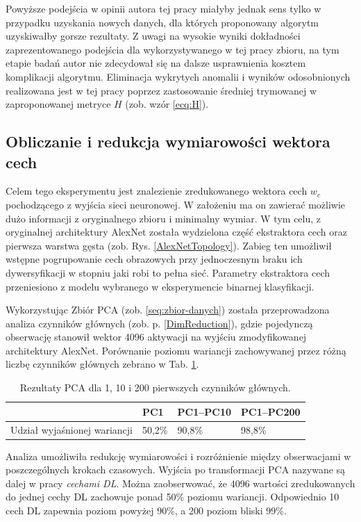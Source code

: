 Powyższe podejścia w opinii autora tej pracy miałyby jednak sens tylko w przypadku uzyskania nowych danych, dla których proponowany algorytm uzyskiwałby gorsze rezultaty. Z uwagi na wysokie wyniki dokładności zaprezentowanego podejścia dla wykorzystywanego w tej pracy zbioru, na tym etapie badań autor nie zdecydował się na dalsze usprawnienia kosztem komplikacji algorytmu. Eliminacja wykrytych anomalii i wyników odosobnionych realizowana jest w tej pracy poprzez zastosowanie średniej trymowanej w zaproponowanej metryce $H$ (zob. wzór \ref{ecq:H}).

\subsection{Obliczanie i redukcja wymiarowości wektora cech}

Celem tego eksperymentu jest znalezienie zredukowanego wektora cech $w_c$ pochodzącego z wyjścia sieci neuronowej. W założeniu ma on zawierać możliwie dużo informacji z oryginalnego zbioru i minimalny wymiar. W tym celu, z oryginalnej architektury AlexNet została wydzielona część ekstraktora cech oraz pierwsza warstwa gęsta (zob. Rys. \ref{AlexNetTopology}). Zabieg ten umożliwił wstępne pogrupowanie cech obrazowych przy jednoczesnym braku ich dywersyfikacji w stopniu jaki robi to pełna sieć. Parametry ekstraktora cech przeniesiono z modelu wybranego w eksperymencie binarnej klasyfikacji. 

Wykorzystując Zbiór PCA (zob. \ref{seq:zbior-danych}) została przeprowadzona analiza czynników głównych (zob. p. \ref{DimReduction}), gdzie pojedynczą obserwację stanowił wektor 4096 aktywacji na wyjściu zmodyfikowanej architektury AlexNet. Porównanie poziomu wariancji zachowywanej przez różną liczbę czynników głównych zebrano w Tab. \ref{PCA-results}.
\renewcommand{\arraystretch}{1.2}
\begin{table}[h!]
 \setlength{\tabcolsep}{12pt}
 \centering
 \caption{Rezultaty PCA dla 1, 10 i 200 pierwszych czynników głównych.}
 \label{PCA-results}
 \begin{tabular}{l|l|l|l}
 
 & PC1 & PC1--PC10 & PC1--PC200 \\ \hline \hline
 Udział wyjaśnionej wariancji & 50,2\% & 90,8\%   & 98,8\% \\ \hline 
 \end{tabular}
 \end{table}
\renewcommand{\arraystretch}{1}

Analiza umożliwiła redukcję wymiarowości i rozróżnienie między obserwacjami w poszczególnych krokach czasowych. Wyjścia po transformacji PCA nazywane \linebreak są dalej w pracy \textit{cechami DL}. Można zaobserwować, że 4096 wartości zredukowanych do jednej cechy DL zachowuje ponad 50\% poziomu wariancji. Odpowiednio 10 cech DL zapewnia poziom powyżej 90\%, a 200 poziom bliski 99\%. 

